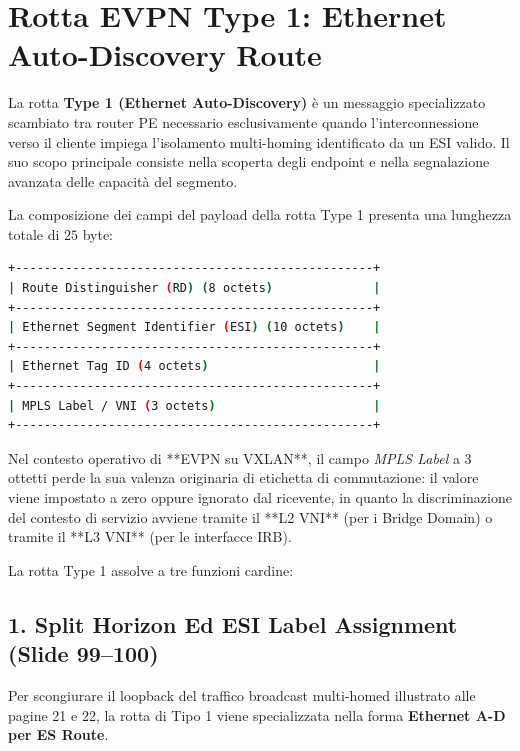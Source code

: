 \documentclass[11pt, a4paper]{article}
\begin{document}
\section{Rotta EVPN Type 1: Ethernet Auto-Discovery Route}

La rotta \textbf{Type 1 (Ethernet Auto-Discovery)} è un messaggio specializzato scambiato tra router PE necessario esclusivamente quando l'interconnessione verso il cliente impiega l'isolamento multi-homing identificato da un ESI valido. Il suo scopo principale consiste nella scoperta degli endpoint e nella segnalazione avanzata delle capacità del segmento.


La composizione dei campi del payload della rotta Type 1 presenta una lunghezza totale di $25$ byte:
\begin{lstlisting}[language=bash]
+--------------------------------------------------+
| Route Distinguisher (RD) (8 octets)              |
+--------------------------------------------------+
| Ethernet Segment Identifier (ESI) (10 octets)    |
+--------------------------------------------------+
| Ethernet Tag ID (4 octets)                       |
+--------------------------------------------------+
| MPLS Label / VNI (3 octets)                      |
+--------------------------------------------------+
\end{lstlisting}

Nel contesto operativo di **EVPN su VXLAN**, il campo \emph{MPLS Label} a 3 ottetti perde la sua valenza originaria di etichetta di commutazione: il valore viene impostato a zero oppure ignorato dal ricevente, in quanto la discriminazione del contesto di servizio avviene tramite il **L2 VNI** (per i Bridge Domain) o tramite il **L3 VNI** (per le interfacce IRB).

La rotta Type 1 assolve a tre funzioni cardine:

\subsection{1. Split Horizon Ed ESI Label Assignment (Slide 99--100)}

Per scongiurare il loopback del traffico broadcast multi-homed illustrato alle pagine 21 e 22, la rotta di Tipo 1 viene specializzata nella forma \textbf{Ethernet A-D per ES Route}.

\end{document}
